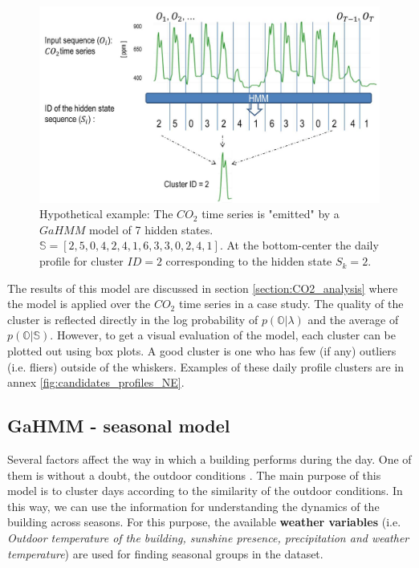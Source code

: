 \begin{figure}[h!]
  \vspace{0.5em} %
  \includegraphics[scale=0.7]{Figures/sequence_explanation.jpg}
  \caption{Hypothetical example: The $CO_2$ time series is "emitted" by a $GaHMM$ model of 7 hidden states. $\mathbb{S} = [2,5,0,4,2,4,1,6,3,3,0,2,4,1]$. At the bottom-center the daily profile for cluster $ID=2$ corresponding to the hidden state $S_k=2$.}
  \label{fig:daily_cluster}
\end{figure}

The results of this model are discussed in section \ref{section:CO2_analysis} where the model is applied over the $CO_2$ time series in a case study. The quality of the cluster is reflected directly in the log probability of $p(\mathbb{O}|\lambda)$ and the average of $p(\mathbb{O}|\mathbb{S})$. However, to get a visual evaluation of the model, each cluster can be plotted out using box plots. A good cluster is one who has few (if any) outliers (i.e. fliers) outside of the whiskers. Examples of these daily profile clusters are in annex \ref{fig:candidates_profiles_NE}.


\subsection{GaHMM - seasonal model}
\label{sec:seasonal_model}

Several factors affect the way in which a building performs during the day. One of them is without a doubt, the outdoor conditions \cite{miller2015forensically, miller2015automated, djamila2017indoor}. The main purpose of this model is to cluster days according to the similarity of the outdoor conditions. In this way, we can use the information for understanding the dynamics of the building across seasons. For this purpose, the available \textbf{weather variables} (i.e. \textit{Outdoor temperature of the building, sunshine presence, precipitation and weather temperature}) are used for finding seasonal groups in the dataset. 


